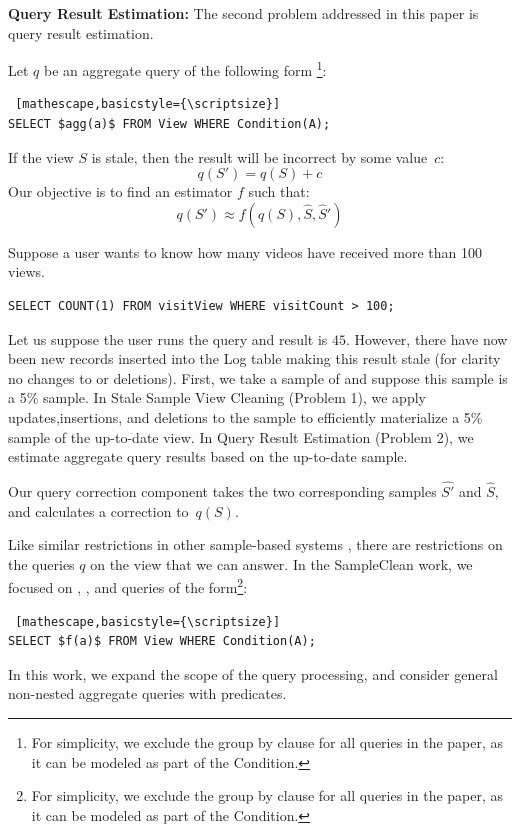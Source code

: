 \noindent\textbf{Query Result Estimation: }
The second problem addressed in this paper is query result estimation.
\begin{problem}
Let $q$ be an aggregate query of the following form \footnote{\scriptsize For simplicity, we exclude the group by clause for all queries in the paper, as it can be modeled as part of the \textsf{Condition}.}:
\begin{lstlisting} [mathescape,basicstyle={\scriptsize}]
SELECT $agg(a)$ FROM View WHERE Condition(A);
\end{lstlisting}
If the view $S$ is stale, then the result will be incorrect by some value~$c$:
\[
q(S') = q(S) + c
\]
Our objective is to find an estimator $f$ such that:
\[
q(S') \approx f(q(S),\widehat{S},\widehat{S}')
\] 
\end{problem}

\begin{example}\label{infexample}
Suppose a user wants to know how many videos have received more than 100 views.
\begin{lstlisting}[basicstyle={\scriptsize}]
SELECT COUNT(1) FROM visitView WHERE visitCount > 100;
\end{lstlisting}
Let us suppose the user runs the query and result is $45$.
However, there have now been new records inserted into the Log table making this result stale (for clarity no changes to  or deletions).
First, we take a sample of  and suppose this sample is a 5\% sample.
In Stale Sample View Cleaning (Problem 1), we apply updates,insertions, and deletions to the sample to efficiently materialize a 5\%  sample of the up-to-date view.
In Query Result Estimation (Problem 2), we estimate aggregate query results based on the up-to-date sample.
\end{example}

\iffalse
Our query correction component takes the two corresponding samples $\widehat{S'}$ and $\widehat{S}$, and calculates a correction to~$q(S)$.

Like similar restrictions in other sample-based systems \cite{agarwalknowing}, there are restrictions on the queries $q$ on the view that we can answer. 
In the SampleClean work, we focused on \sumfunc, \countfunc, and \avgfunc queries of the form\footnote{\scriptsize For simplicity, we exclude the group by clause for all queries in the paper, as it can be modeled as part of the \textsf{Condition}.}: 
\begin{lstlisting} [mathescape,basicstyle={\scriptsize}]
SELECT $f(a)$ FROM View WHERE Condition(A);
\end{lstlisting}
In this work, we expand the scope of the query processing, and consider general non-nested aggregate queries with predicates.

